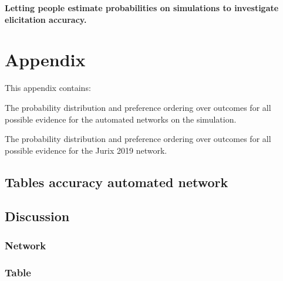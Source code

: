 \documentclass[12pt]{article}
\begin{document}
\textbf{Letting people estimate probabilities on simulations to investigate elicitation accuracy.}






\section{Appendix}

This appendix contains:

The probability distribution and preference ordering over outcomes for all possible evidence for the automated networks on the simulation.

The probability distribution and preference ordering over outcomes for all possible evidence for the Jurix 2019 network.

\newpage
\subsection{Tables accuracy automated network}
%
\subsection{Discussion}
\subsubsection{Network}
%
\subsubsection{Table}
%
\end{document}
